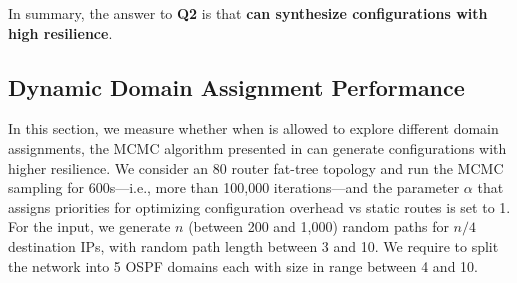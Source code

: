 \begin{figure}
	\centering
\end{figure}

In summary, the answer to \textbf{Q2} is that
\textbf{\name can synthesize configurations with high resilience}.


\subsection{Dynamic Domain Assignment Performance} \label{sec:mcmceval}

In this section, we measure whether
when \name  is allowed to explore different domain assignments,
the MCMC algorithm presented in 
can 
generate configurations
with higher resilience. 
We consider an 80 router fat-tree topology and run the MCMC sampling
for 600s---i.e., more than 100,000 iterations---and the parameter
$\alpha$ that assigns priorities for optimizing configuration overhead
vs static routes is set to 1. For the input, we generate $n$ (between
200 and 1,000) random paths for $n/4$ destination IPs, with random
path length between 3 and 10.  We require \name to split the network
into 5 OSPF domains each with size in range between 4 and 10.

